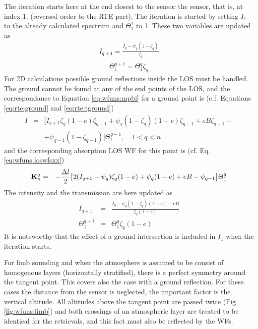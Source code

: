  The iteration starts here at the end closest to the sensor the
 sensor, that is, at index 1. (reversed order to the RTE part).  The
 iteration is started by setting $I_1$ to the already calculated
 spectrum and $\Theta^1_1$ to 1.  These two variables are updated as
 \begin{eqnarray}
   I_{q+1} = \frac{I_q - \psi_q(1-\zeta_q)}{\zeta_q} 
 \end{eqnarray}
 \begin{eqnarray}
   \Theta_1^{q+1} =  \Theta_1^q \zeta_q
 \end{eqnarray}
 For 2D calculations possible ground reflections inside the LOS must
 be handled. The ground cannot be found at any of the end points of
 the LOS, and the correspondance to Equation \ref{eq:wfuns:mpbi} for a
 ground point is (c.f. Equations \ref{eq:rte:ground} and
 \ref{eq:rte:tground})
 \begin{eqnarray}
   I &=&\Big[I_{q+1}\zeta_q(1-e)\zeta_{q-1}+\psi_q(1-\zeta_q)(1-e)\zeta_{q-1}
          +eB\zeta_{q-1}+ \nonumber \\
     & & + \psi_{q-1}(1-\zeta_{q-1}) \Big] \Theta^{q-1}_1, \quad 1<q<n 
    \label{eq:wfuns:mpbi_ground}
 \end{eqnarray}
 and the corresponding absorption LOS WF for this point is (cf. Eq.
 \ref{eq:wfuns:loswfsxx})
 \begin{eqnarray}
   \mathbf{K}_{\kappa}^q &=& -\frac{\Delta l}{2} \big[ 2(I_{q+1}-\psi_q)\zeta_q(1-e)+
           \psi_q(1-e)+eB-\psi_{q-1} \big] \Theta^q_1 
 \end{eqnarray}
 The intensity and the transmission are here updated as
 \begin{eqnarray}
   I_{q+1} &=& \frac{I_q-\psi_q(1-\zeta_q)(1-e)-eB}{\zeta_q(1-e)}  \nonumber \\
   \Theta_1^{q+1} &=& \Theta_1^{q}\zeta_q(1-e) \nonumber
 \end{eqnarray}
 It is noteworthy that the effect of a ground intersection is included
 in $I_1$ when the iteration starts.  




 
 \label{sec:wfuns:limb}
    
 For limb sounding and when the atmosphere is assumed to be consist of
 homogenous layers (horizontally stratified), there is a perfect
 symmetry around the tangent point. This covers also the case with a
 ground reflection. For these cases the distance from the sensor is
 neglected, the important factor is the vertical altitude.  All
 altitudes above the tangent point are passed twice (Fig.
 \ref{fig:wfuns:limb}) and both crossings of an atmospheric layer are
 treated to be identical for the retrievals, and this fact must also
 be reflected by the WFs.

